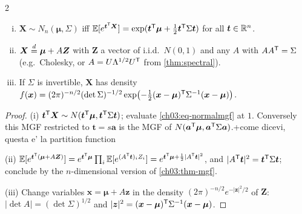 \begin{paracol}{2}
\begin{proposition}\label{ch03:prop-mvn}
\leavevmode
\begin{enumerate}[(i)]
  \item $\bm X\sim N_n(\bm\mu,\Sigma)$ iff $\mathbb{E}[e^{\bm t^{\mathsf T}\bm X}]=\exp(\bm t^{\mathsf T}\bm\mu+\frac12\bm t^{\mathsf T}\Sigma\bm t)$ for all $\bm t\in\mathbb{R}^n$.
  \item $\bm X\stackrel{d}{=}\bm\mu+A\bm Z$ with $\bm Z$ a vector of i.i.d.\ $N(0,1)$ and any $A$ with $AA^{\mathsf T}=\Sigma$ (e.g.\ Cholesky, or
        $A=U\Lambda^{1/2}U^{\mathsf T}$ from \cref{thm:spectral}).
  \item If $\Sigma$ is invertible, $\bm X$ has density
        $f(\bm x)=(2\pi)^{-n/2}(\det\Sigma)^{-1/2}\exp\bigl(-\frac12(\bm x-\bm\mu)^{\mathsf T}\Sigma^{-1}(\bm x-\bm\mu)\bigr)$.
\end{enumerate}
\end{proposition}
\begin{proof}
(i) $\bm t^{\mathsf T}\bm X\sim N(\bm t^{\mathsf T}\bm\mu,\bm t^{\mathsf T}\Sigma\bm t)$; evaluate \eqref{ch03:eq-normalmgf} at $1$. Conversely this MGF restricted to
$\bm t=s\bm a$ is the MGF of $N(\bm a^{\mathsf T}\bm\mu,\bm a^{\mathsf T}\Sigma\bm a)$.\note+{come dicevi, questa e' la partition function}

(ii) $\mathbb{E}[e^{\bm t^{\mathsf T}(\bm\mu+A\bm Z)}]=e^{\bm t^{\mathsf T}\bm\mu}\prod_i\mathbb{E}[e^{(A^{\mathsf T}\bm t)_iZ_i}]
=e^{\bm t^{\mathsf T}\bm\mu+\frac12|A^{\mathsf T}\bm t|^2}$, and $|A^{\mathsf T}\bm t|^2=\bm t^{\mathsf T}\Sigma\bm t$; conclude by the $n$-dimensional version of
\cref{ch03:thm-mgf}.

(iii) Change variables $\bm x=\bm\mu+A\bm z$ in the density $(2\pi)^{-n/2}e^{-|\bm z|^2/2}$ of $\bm Z$:
$|\det A|=(\det\Sigma)^{1/2}$ and $|\bm z|^2=(\bm x-\bm\mu)^{\mathsf T}\Sigma^{-1}(\bm x-\bm\mu)$.
\end{proof}


\end{paracol}
